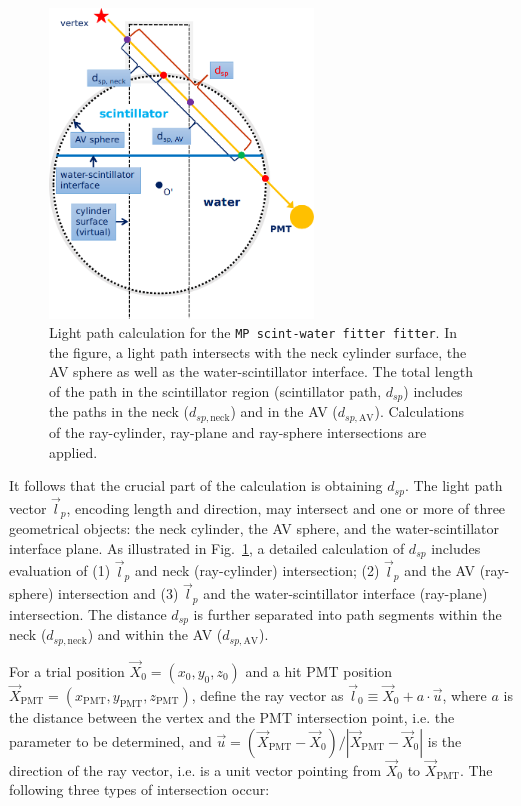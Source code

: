 \begin{figure}[!htb]
	\centering
	\includegraphics[width=7cm]{scintpath.png}
	\caption[Light path calculation for the \texttt{MP scint-water fitter fitter}.]{Light path calculation for the \texttt{MP scint-water fitter fitter}. In the figure, a light path intersects with the neck cylinder surface, the AV sphere as well as the water-scintillator interface. The total length of the path in the scintillator region (scintillator path, $d_{sp}$) includes the paths in the neck ($d_{sp,\mathrm{neck}}$) and in the AV ($d_{sp,\mathrm{AV}}$). Calculations of the ray-cylinder, ray-plane and ray-sphere intersections are applied.	\label{fig:scintpath}}
\end{figure}

It follows that the crucial part of the calculation is obtaining $d_{sp}$. The light path vector $\vec{l}_p$, encoding length and direction, may intersect and one or more of three geometrical objects: the neck cylinder, the AV sphere, and the water-scintillator interface plane. As illustrated in Fig.~\ref{fig:scintpath}, a detailed calculation of $d_{sp}$ includes evaluation of (1) $\vec{l}_p$ and neck (ray-cylinder) intersection; (2) $\vec{l}_p$ and the AV (ray-sphere) intersection and (3) $\vec{l}_p$ and the water-scintillator interface (ray-plane) intersection. The distance $d_{sp}$ is further separated into path segments within the neck ($d_{sp,\mathrm{neck}}$) and within the AV ($d_{sp,\mathrm{AV}}$). 

For a trial position $\vec{X}_0=(x_0,y_0,z_0)$ and a hit PMT position $\vec{X}_{\mathrm{PMT}}=(x_\mathrm{PMT},y_\mathrm{PMT},z_\mathrm{PMT})$, define the ray vector as $\vec{l}_0\equiv\vec{X}_0+a\cdot \vec{u}$, where $a$ is the distance between the vertex and the PMT intersection point, i.e. the parameter to be determined, and $\vec u=(\vec{X}_{\mathrm{PMT}}-\vec{X}_0 ) / |\vec{X}_{\mathrm{PMT}}-\vec{X}_0|$ is the direction of the ray vector, i.e. is a unit vector pointing from $\vec{X}_0$ to $\vec{X}_{\mathrm{PMT}}$. The following three types of intersection occur:

